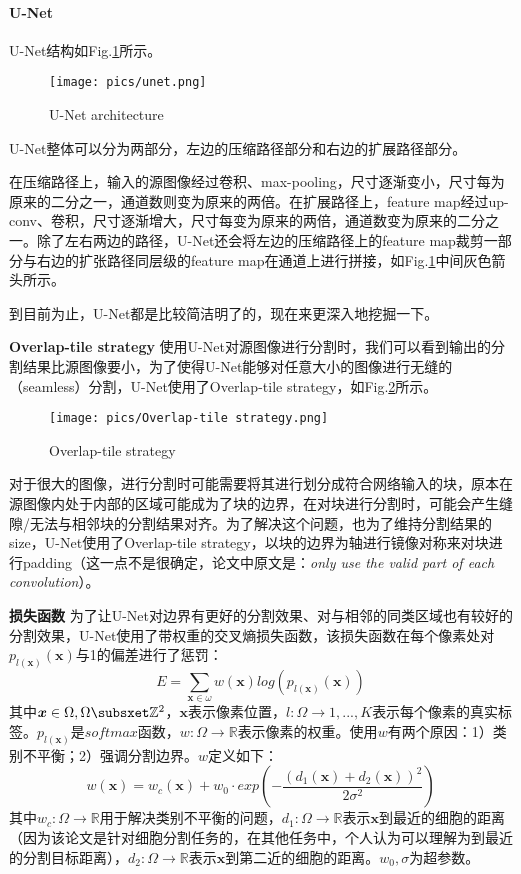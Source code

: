 \paragraph{U-Net}
U-Net结构如Fig.\ref{fig:unet}所示。
\begin{figure}[h]
	\centering
	\texttt{[image: pics/unet.png]}
	\caption{U-Net architecture}
	\label{fig:unet}
\end{figure}
U-Net整体可以分为两部分，左边的压缩路径部分和右边的扩展路径部分。

在压缩路径上，输入的源图像经过卷积、max-pooling，尺寸逐渐变小，尺寸每为原来的二分之一，通道数则变为原来的两倍。在扩展路径上，feature map经过up-conv、卷积，尺寸逐渐增大，尺寸每变为原来的两倍，通道数变为原来的二分之一。除了左右两边的路径，U-Net还会将左边的压缩路径上的feature map裁剪一部分与右边的扩张路径同层级的feature map在通道上进行拼接，如Fig.\ref{fig:unet}中间灰色箭头所示。

到目前为止，U-Net都是比较简洁明了的，现在来更深入地挖掘一下。

\par{\textbf{Overlap-tile strategy}} 使用U-Net对源图像进行分割时，我们可以看到输出的分割结果比源图像要小，为了使得U-Net能够对任意大小的图像进行无缝的（seamless）分割，U-Net使用了Overlap-tile strategy，如Fig.\ref{fig:overlap-tile}所示。
\begin{figure}[h]
	\centering
	\texttt{[image: pics/Overlap-tile strategy.png]}
	\caption{Overlap-tile strategy}
	\label{fig:overlap-tile}
\end{figure}
对于很大的图像，进行分割时可能需要将其进行划分成符合网络输入的块，原本在源图像内处于内部的区域可能成为了块的边界，在对块进行分割时，可能会产生缝隙/无法与相邻块的分割结果对齐。为了解决这个问题，也为了维持分割结果的size，U-Net使用了Overlap-tile strategy，以块的边界为轴进行镜像对称来对块进行padding（这一点不是很确定，论文中原文是：\textit{only use the valid part of each convolution}）。

\par{\textbf{损失函数}}
为了让U-Net对边界有更好的分割效果、对与相邻的同类区域也有较好的分割效果，U-Net使用了带权重的交叉熵损失函数，该损失函数在每个像素处对$p_{l(\boldsymbol{x})}(\boldsymbol{x})$与1的偏差进行了惩罚：
$$
E = \sum_{\boldsymbol{x} \in \omega} w(\boldsymbol{x}) log(p_{l(\boldsymbol{x})}(\boldsymbol{x}))
$$
其中$\boldsymbol{x} \in \Omega, \Omega \subsxet \mathbb{Z}^2$，$\boldsymbol{x}$表示像素位置，$l: \Omega \rightarrow {1, ..., K}$表示每个像素的真实标签。$p_{l(\boldsymbol{x})}$是$softmax$函数，$w: \Omega \rightarrow \mathbb{R}$表示像素的权重。使用$w$有两个原因：1）类别不平衡；2）强调分割边界。$w$定义如下：
$$
w(\boldsymbol{x}) = w_c(\boldsymbol{x}) + w_0 \cdot exp(-\frac{(d_1(\boldsymbol{x}) + d_2(\boldsymbol{x}))^2}{2\sigma^2})
$$
其中$w_c: \Omega \rightarrow \mathbb{R}$用于解决类别不平衡的问题，$d_1: \Omega \rightarrow \mathbb{R}$表示$\boldsymbol{x}$到最近的细胞的距离（因为该论文是针对细胞分割任务的，在其他任务中，个人认为可以理解为到最近的分割目标距离），$d_2: \Omega \rightarrow \mathbb{R}$表示$\boldsymbol{x}$到第二近的细胞的距离。$w_0, \sigma$为超参数。

